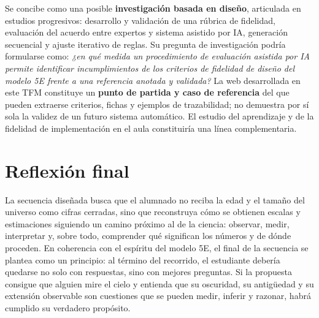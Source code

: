 Se concibe como una posible \textbf{investigación basada en diseño}, articulada en estudios progresivos: desarrollo y validación de una rúbrica de fidelidad, evaluación del acuerdo entre expertos y sistema asistido por IA, generación secuencial y ajuste iterativo de reglas. Su pregunta de investigación podría formularse como: \emph{¿en qué medida un procedimiento de evaluación asistida por IA permite identificar incumplimientos de los criterios de fidelidad de diseño del modelo 5E frente a una referencia anotada y validada?} La web desarrollada en este TFM constituye un \textbf{punto de partida y caso de referencia} del que pueden extraerse criterios, fichas y ejemplos de trazabilidad; no demuestra por sí sola la validez de un futuro sistema automático. El estudio del aprendizaje y de la fidelidad de implementación en el aula constituiría una línea complementaria.

\section{Reflexión final}

La secuencia diseñada busca que el alumnado no reciba la edad y el tamaño del universo como cifras cerradas, sino que reconstruya cómo se obtienen escalas y estimaciones siguiendo un camino próximo al de la ciencia: observar, medir, interpretar y, sobre todo, comprender qué significan los números y de dónde proceden. En coherencia con el espíritu del modelo 5E, el final de la secuencia se plantea como un principio: al término del recorrido, el estudiante debería quedarse no solo con respuestas, sino con mejores preguntas. Si la propuesta consigue que alguien mire el cielo y entienda que su oscuridad, su antigüedad y su extensión observable son cuestiones que se pueden medir, inferir y razonar, habrá cumplido su verdadero propósito.
